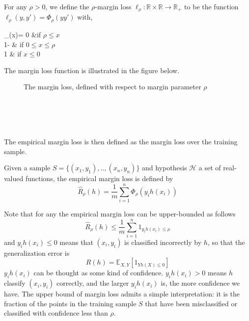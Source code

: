 \begin{definition}
	For any $\rho > 0$, we define the $\rho$-margin loss $\ell_{\rho} : \mathbb{R} \times \mathbb{R} \to \mathbb{R}_{+}$ to be the function $\ell_{\rho}(y,y') = \Phi_{\rho}(yy')$ with,
	\begin{numcases}{\Phi_{\rho}(x)=}
	0 &if $\rho \leq x$ \\
	1- & if $0\leq x \leq \rho$ \\
	1 & if $x \leq 0$
	\end{numcases}
\end{definition}
The margin loss function is illustrated in the figure below.
\begin{figure}[ht]    \centering 
	\caption{The margin loss, defined with respect to margin parameter $\rho$}
\end{figure}
\\
\\
\\
\\
The empirical margin loss is then defined as the margin loss over the training sample.
\begin{definition}
	Given a sample $S=\{(x_1,y_1),..,(x_n,y_n)\}$ and hypothesis $\mathcal{H}$ a set of real-valued functions, the empirical margin loss is	defined by
	\begin{equation}
	\hat{R}_{\rho}(h) = \frac{1}{m} \sum_{i=1}^{n} 	\Phi_{\rho}(y_ih(x_i))
	\end{equation}
\end{definition}

Note that for any the empirical margin loss can be upper-bounded as follows
\begin{equation}
\hat{R}_{\rho}(h) \leq \frac{1}{m} \sum_{i=1}^{n} 1_{y_ih(x_i) \leq \rho}
\end{equation}
and $y_ih(x_i)\leq 0$ means that $(x_i, y_i)$ is classified incorrectly by $h$, so that the generalization error is 
\begin{equation}
R(h) = \mathbb{E}_{X,Y}[1_{Yh(X) \leq 0}]
\end{equation}
$y_ih(x_i)$ can be thought as some kind of confidence. $y_ih(x_i)>0$ means $h$ classify $(x_i,y_i)$ correctly, and the larger $y_ih(x_i)$ is, the more confidence we have. The upper bound of margin loss admits a simple interpretation: it is the fraction of the points in the
training sample $S$ that have been misclassified or classified with confidence less than $\rho$.

